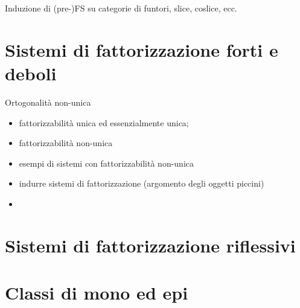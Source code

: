 \begin{example}
 Induzione di (pre-)FS su categorie di funtori, slice, coslice, ecc.
\end{example}

\begin{esercizi}
 \item
 \item
 \item
 \item
 \item
\end{esercizi}
\section[Fattorizzazione]{Sistemi di fattorizzazione forti e deboli}
Ortogonalità non-unica
\begin{itemize}
 \item fattorizzabilità unica ed essenzialmente unica;
 \item fattorizzabilità non-unica
 \item esempi di sistemi con fattorizzabilità non-unica
 \item indurre sistemi di fattorizzazione (argomento degli oggetti piccini)
 \item
\end{itemize}
\begin{esercizi}
 \item
 \item
 \item
 \item
 \item
\end{esercizi}
\section[Riflessività]{Sistemi di fattorizzazione riflessivi}
\begin{esercizi}
 \item
 \item
 \item
 \item
 \item
\end{esercizi}
\section[Mono ed epi]{Classi di mono ed epi}
\begin{esercizi}
 \item
 \item
 \item
 \item
 \item
\end{esercizi}
